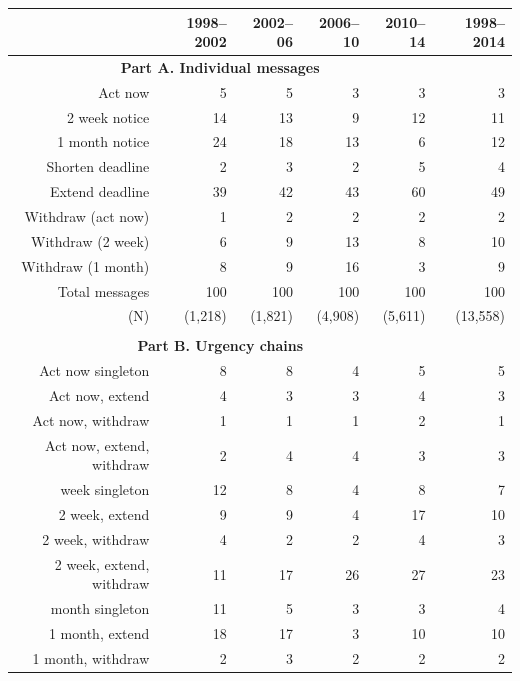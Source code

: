 \documentclass[letter,12pt]{article}
\begin{document}
\begin{table}
\centering
\begin{tabular}{rrrrr|r}
      & 1998--2002 & 2002--06 & 2006--10 & 2010--14 & 1998--2014 \\ \hline
 \multicolumn{5}{c|}{\textbf{Part A. Individual messages}} \\
 Act now             & 5  & 5  & 3  & 3  & 3 \\ 
 2 week notice       & 14 & 13 & 9  & 12 & 11 \\ 
 1 month notice      & 24 & 18 & 13 & 6  & 12 \\ \hdashline
 Shorten deadline    & 2  & 3  & 2  & 5  &  4 \\ 
 Extend deadline     & 39 & 42 & 43 & 60 & 49 \\ \hdashline
 Withdraw (act now)  & 1  & 2  & 2  & 2  &  2 \\ 
 Withdraw (2 week)   & 6  & 9  & 13 & 8  & 10 \\ 
 Withdraw (1 month)  & 8  & 9  & 16 & 3  & 9  \\ \hline
 Total messages      & 100 & 100 & 100 & 100 & 100 \\ 
(N)                  & (1,218) & (1,821) & (4,908) & (5,611) & (13,558)\\ 
\\ [-1.5ex]
 \multicolumn{5}{c|}{\textbf{Part B. Urgency chains}}  \\
Act now singleton         & 8  & 8  & 4  & 5  &   5  \\
Act now, extend           & 4  & 3  & 3  & 4  &   3  \\
Act now, withdraw         & 1  & 1  & 1  & 2  &   1  \\
Act now, extend, withdraw & 2  & 4  & 4  & 3  &   3  \\ \hdashline
2 week singleton          & 12 & 8  & 4  & 8  &   7  \\
2 week, extend            & 9  & 9  & 4  & 17 &  10  \\
2 week, withdraw          & 4  & 2  & 2  & 4  &   3  \\
2 week, extend, withdraw  & 11 & 17 & 26 & 27 &  23  \\ \hdashline
1 month singleton         & 11 & 5  & 3  & 3  &   4  \\
1 month, extend           & 18 & 17 & 3  & 10 &  10  \\
1 month, withdraw         & 2  & 3  & 2  & 2  &   2  \\

\end{tabular}
\end{table}
\end{document}
